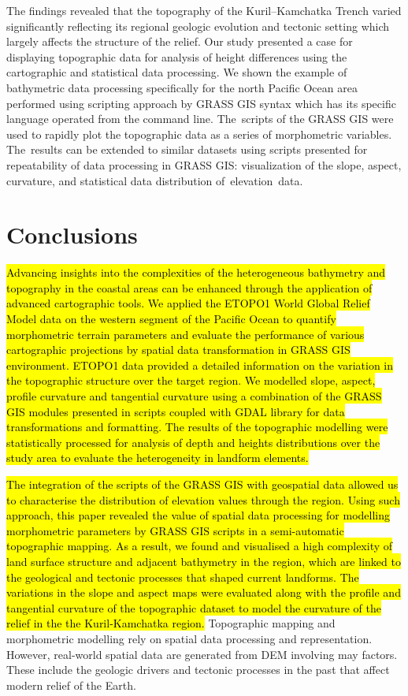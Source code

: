 \documentclass[technologies,article,accept,pdftex,moreauthors]{Definitions/mdpi}
\begin{document}
The findings revealed that the topography of the Kuril--Kamchatka Trench varied significantly reflecting its regional geologic evolution and tectonic setting which largely affects the structure of the relief. Our study presented a case for displaying topographic data for analysis of height differences using the cartographic and statistical data processing. We shown the example of bathymetric data processing specifically for the north Pacific Ocean area performed using scripting approach by GRASS GIS syntax which has its specific language operated from the command line. The~scripts of the GRASS GIS were used to rapidly plot the topographic data as a series of morphometric variables. The~results can be extended to similar datasets using scripts presented for repeatability of data processing in GRASS GIS: visualization of the slope, aspect, curvature, and statistical data distribution \mbox{of elevation~data}.

\section{Conclusions}

\hl{Advancing insights into the complexities of the heterogeneous bathymetry and topography in the coastal areas can be enhanced through the application of advanced cartographic tools. We applied the ETOPO1 World Global Relief Model data on the western segment of the Pacific Ocean to quantify morphometric terrain parameters and evaluate the performance of various cartographic projections by spatial data transformation in GRASS GIS environment. ETOPO1 data provided a detailed information on the variation in the topographic structure over the target region. We modelled slope, aspect, profile curvature and tangential curvature using a combination of the GRASS GIS modules presented in scripts coupled with GDAL library for data transformations and formatting. The results of the topographic modelling were statistically processed for analysis of depth and heights distributions over the study area to evaluate the heterogeneity in landform elements.}

\hl{The integration of the scripts of the GRASS GIS with geospatial data allowed us to characterise the distribution of elevation values through the region. Using such approach, this paper revealed the value of spatial data processing for modelling morphometric parameters by GRASS GIS scripts in a semi-automatic topographic mapping. As a result, we found and visualised a high complexity of land surface structure and adjacent bathymetry in the region, which are linked to the geological and tectonic processes that shaped current landforms. The variations in the slope and aspect maps were evaluated along with the profile and tangential curvature of the topographic dataset to model the curvature of the relief in the the Kuril-Kamchatka region. }Topographic mapping and morphometric modelling rely on spatial data processing and representation. However, real-world spatial data are generated from DEM involving may factors. These include the geologic drivers and tectonic processes in the past that affect modern relief of  the Earth. 
\end{document}
